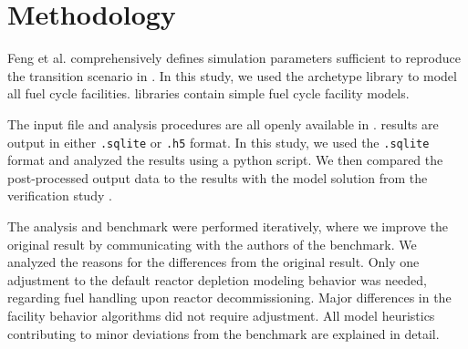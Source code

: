 \section{Methodology}

Feng et al. comprehensively defines simulation parameters
sufficient to reproduce the transition scenario in \Cyclus.
In this study, we used the \Cycamore \cite{huff_fundamental_2016}
 archetype library to model
all fuel cycle facilities. \Cycamore libraries contain
simple fuel cycle facility models. 

The \Cyclus input file and analysis procedures are all
openly available in \cite{bae_arfc/transition-scenarios:_2018}.
\Cyclus results are output in either \texttt{.sqlite} or
\texttt{.h5} format. In this study, we used the
\texttt{.sqlite} format and analyzed the results
using a python script. We then compared the post-processed
output data to the results with the
model solution from the verification study \cite{feng_standardized_2016}.

The analysis and benchmark were performed iteratively,
where we improve the original result by communicating
with the authors of the benchmark. 
We analyzed the reasons for the differences from the original
result. Only one adjustment to the default reactor depletion modeling behavior 
was needed, regarding fuel handling upon reactor decommissioning.
Major differences in the facility behavior algorithms did not require 
adjustment. All model heuristics contributing to minor deviations from the 
benchmark are explained in detail.
